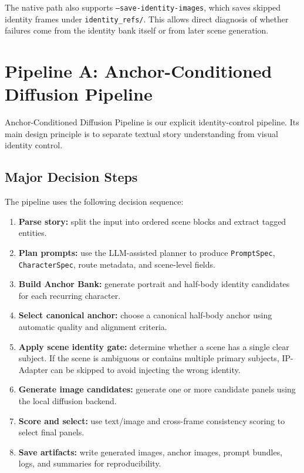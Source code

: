 \documentclass[11pt,a4paper]{article}
\newcommand{\pipelineA}{Anchor-Conditioned Diffusion Pipeline}
\begin{document}
The native path also supports \texttt{--save-identity-images}, which saves skipped identity frames under \texttt{identity\_refs/}. This allows direct diagnosis of whether failures come from the identity bank itself or from later scene generation.

\section{Pipeline A: Anchor-Conditioned Diffusion Pipeline}
\label{sec:pipeline_a}

\pipelineA{} is our explicit identity-control pipeline. Its main design principle is to separate textual story understanding from visual identity control.

\subsection{Major Decision Steps}

The pipeline uses the following decision sequence:

\begin{enumerate}[leftmargin=*]
    \item \textbf{Parse story:} split the input into ordered scene blocks and extract tagged entities.
    \item \textbf{Plan prompts:} use the LLM-assisted planner to produce \texttt{PromptSpec}, \texttt{CharacterSpec}, route metadata, and scene-level fields.
    \item \textbf{Build Anchor Bank:} generate portrait and half-body identity candidates for each recurring character.
    \item \textbf{Select canonical anchor:} choose a canonical half-body anchor using automatic quality and alignment criteria.
    \item \textbf{Apply scene identity gate:} determine whether a scene has a single clear subject. If the scene is ambiguous or contains multiple primary subjects, IP-Adapter can be skipped to avoid injecting the wrong identity.
    \item \textbf{Generate image candidates:} generate one or more candidate panels using the local diffusion backend.
    \item \textbf{Score and select:} use text/image and cross-frame consistency scoring to select final panels.
    \item \textbf{Save artifacts:} write generated images, anchor images, prompt bundles, logs, and summaries for reproducibility.
\end{enumerate}
\end{document}
